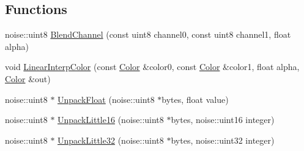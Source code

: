 \subsection*{Functions}
\begin{DoxyCompactItemize}
\item 
noise\+::uint8 \hyperlink{namespacenoise_1_1utils_a2711778d9c2d9c7641e6deb98bea878f}{Blend\+Channel} (const uint8 channel0, const uint8 channel1, float alpha)
\item 
void \hyperlink{namespacenoise_1_1utils_ad7a9086f885346fea9dc0011f1884f70}{Linear\+Interp\+Color} (const \hyperlink{classnoise_1_1utils_1_1_color}{Color} \&color0, const \hyperlink{classnoise_1_1utils_1_1_color}{Color} \&color1, float alpha, \hyperlink{classnoise_1_1utils_1_1_color}{Color} \&out)
\item 
noise\+::uint8 $\ast$ \hyperlink{namespacenoise_1_1utils_aff3ae07c3dea4f2502af570f34502912}{Unpack\+Float} (noise\+::uint8 $\ast$bytes, float value)
\item 
noise\+::uint8 $\ast$ \hyperlink{namespacenoise_1_1utils_ad46552515352d74288121e033983177d}{Unpack\+Little16} (noise\+::uint8 $\ast$bytes, noise\+::uint16 integer)
\item 
noise\+::uint8 $\ast$ \hyperlink{namespacenoise_1_1utils_a214a013f1898a6366c1f740500afe23d}{Unpack\+Little32} (noise\+::uint8 $\ast$bytes, noise\+::uint32 integer)
\end{DoxyCompactItemize}
